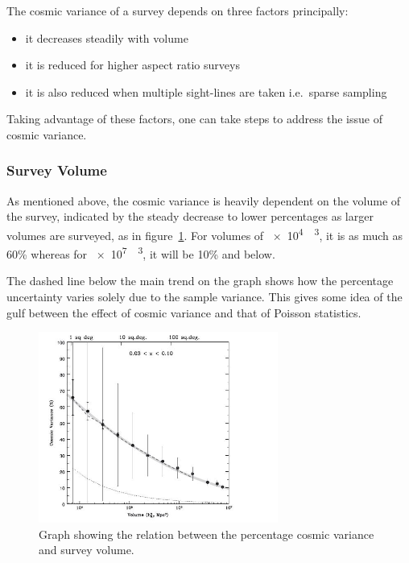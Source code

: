 		The cosmic variance of a survey depends on three factors principally:
		\begin{itemize}
			\item it decreases steadily with volume
			\item it is reduced for higher aspect ratio surveys
			\item it is also reduced when multiple sight-lines are taken i.e.\ sparse sampling
		\end{itemize}
		Taking advantage of these factors, one can take steps to address the issue of cosmic variance.

		\subsubsection{Survey Volume} %
		\label{ssub:survey_volume}
			As mentioned above, the cosmic variance is heavily dependent on the volume of the survey, indicated by the steady decrease to lower percentages as larger volumes are surveyed, as in figure~\ref{fig:cv1}.  For volumes of \SI{e4}{\mega\parsec\cubed}, it is as much as 60\% whereas for \SI{e7}{\mega\parsec\cubed}, it will be 10\% and below.

			The dashed line below the main trend on the graph shows how the percentage uncertainty varies solely due to the sample variance. This gives some idea of the gulf between the effect of cosmic variance and that of Poisson statistics.
			\begin{figure}
				\centering
				\includegraphics[width=0.7\textwidth]{../Images/cosmic_variance1.JPG}
				\caption{Graph showing the relation between the percentage cosmic variance and survey volume.\label{fig:cv1}}
			\end{figure}

